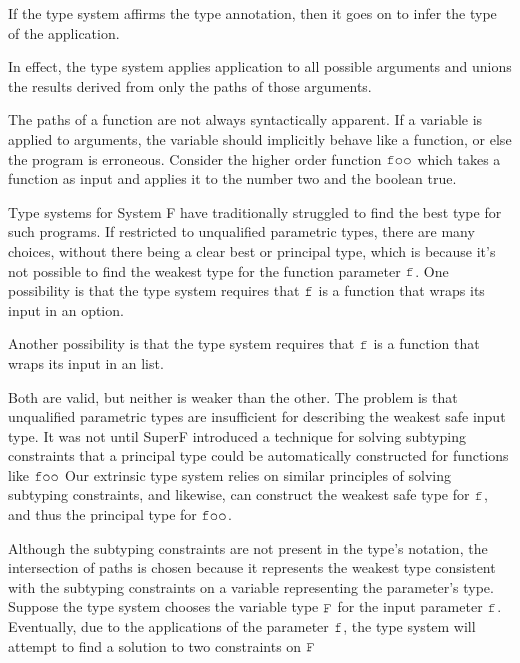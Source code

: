 \documentclass[acmsmall]{acmart}
\theoremstyle{definition}
\begin{document}
\noindent
If the type system affirms the type annotation,
then it goes on to infer the type of the application. 


\noindent
In effect, the type system applies application to all possible arguments
and unions the results derived from only the paths of those arguments. 

The paths of a function are not always syntactically apparent. 
If a variable is applied to arguments, the variable should implicitly behave 
like a function, or else the program is erroneous. 
Consider the higher order function $\J{foo}$ which takes a function as input
and applies it to the number two and the boolean true.


\noindent
Type systems for System F have traditionally struggled to find the best
type for such programs. If restricted to unqualified parametric types, there are many choices,
without there being a clear best or principal type, 
which is because it's not possible to find the weakest type for the function parameter
$\J{f}$.
One possibility is that the type system requires that $\J{f}$ is a function that wraps its
input in an option. 


\noindent
Another possibility is that the type system requires that $\J{f}$ is a function that wraps its
input in an list. 


\noindent
Both are valid, but neither is weaker than the other. The problem is that unqualified parametric
types are insufficient for describing the weakest safe input type.
It was not until SuperF introduced a technique for solving subtyping constraints
that a principal type could be automatically constructed for functions like $\J{foo}$
Our extrinsic type system relies on similar principles of solving subtyping constraints,
and likewise, can construct the weakest safe type for $\J{f}$, and thus the principal type for $\J{foo}$.


\noindent
Although the subtyping constraints are not present in the type's notation,
the intersection of paths is chosen because it represents the weakest type
consistent with the subtyping constraints on a variable representing the parameter's type. 
Suppose the type system chooses the variable type $\J{F}$ for the input parameter $\J{f}$.
Eventually, due to the applications of the parameter $\J{f}$, the type
system will attempt to find a solution to two constraints on $\J{F}$
\end{document}
